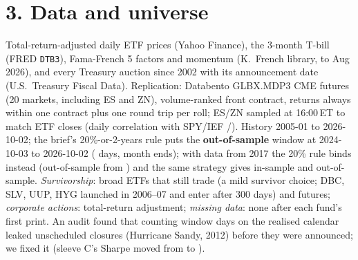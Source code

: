 \documentclass[11pt]{article}
\newcommand{\sect}[1]{\vspace{1pt}\section*{#1}\vspace{-4pt}}
\begin{document}
\sect{3. Data and universe}
Total-return-adjusted daily ETF prices (Yahoo Finance), the 3-month T-bill (FRED \texttt{DTB3}), Fama-French 5 factors and momentum (K.\ French library, to Aug 2026), and every Treasury auction since 2002 with its announcement date (U.S.\ Treasury Fiscal Data). Replication: Databento GLBX.MDP3 CME futures (20 markets, including ES and ZN), volume-ranked front contract, returns always within one contract plus one round trip per roll; ES/ZN sampled at 16:00\,ET to match ETF closes (daily correlation with SPY/IEF \corrES/\corrZN). History 2005-01 to 2026-10-02; the brief's 20\%-or-2-years rule puts the \textbf{out-of-sample} window at 2024-10-03 to 2026-10-02 (\nOOSdays{} days, \nOOSmonths{} month ends); with data from 2017 the 20\% rule binds instead (out-of-sample from \oosStartSeventeen) and the same strategy gives \ISseventeen{} in-sample and \OOSseventeen{} out-of-sample. \emph{Survivorship}: broad ETFs that still trade (a mild survivor choice; DBC, SLV, UUP, HYG launched in 2006--07 and enter after 300 days) and futures; \emph{corporate actions}: total-return adjustment; \emph{missing data}: none after each fund's first print. An audit found that counting window days on the realised calendar leaked unscheduled closures (Hurricane Sandy, 2012) before they were announced; we fixed it (sleeve C's Sharpe moved from \CpreFix{} to \CpostFix).
\end{document}
